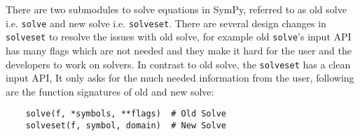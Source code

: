 
There are two submodules to solve equations in SymPy, referred to as old solve
i.e. \texttt{solve} and new solve i.e. \texttt{solveset}. There are several
design changes in \texttt{solveset} to resolve the issues with old solve, for
example old \texttt{solve}'s input API has many flags which are not needed and
they make it hard for the user and the developers to work on solvers. In
contrast to old solve, the \texttt{solveset} has a clean input API, It only
asks for the much needed information from the user, following are the function
signatures of old and new solve:

\begin{verbatim}
    solve(f, *symbols, **flags)  # Old Solve
    solveset(f, symbol, domain)  # New Solve
\end{verbatim}
